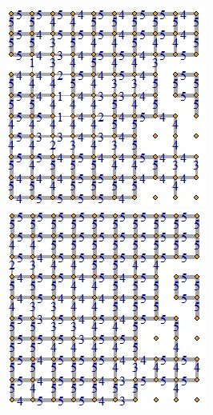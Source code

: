 \begin{figure}[t]
    \vspace{0.25cm} %
    
    \begin{minipage}{0.45\textwidth} %
        \centering
        \includegraphics[width=\textwidth]{images/villagesEvol3.jpg}
        \caption{} %
        \label{fig:sub3}
    \end{minipage}\hfill
    \begin{minipage}{0.45\textwidth} %
        \centering
        \includegraphics[width=\textwidth]{images/villagesEvol4.jpg}
        \caption{} %
        \label{fig:sub4}
    \end{minipage}
    

\end{figure}

